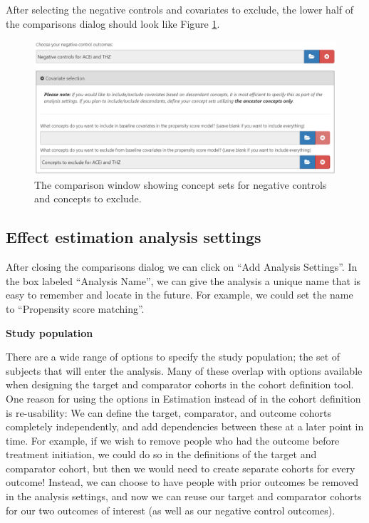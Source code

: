 \documentclass[11pt]{book}
\begin{document}
After selecting the negative controls and covariates to exclude, the
lower half of the comparisons dialog should look like Figure
\ref{fig:comparisons2}.

\begin{figure}

{\centering \includegraphics[width=1\linewidth]{images/PopulationLevelEstimation/comparisons2} 

}

\caption{The comparison window showing concept sets for negative controls and concepts to exclude.}\label{fig:comparisons2}
\end{figure}

\subsection{Effect estimation analysis
settings}\label{effect-estimation-analysis-settings}

After closing the comparisons dialog we can click on ``Add Analysis
Settings''. In the box labeled ``Analysis Name'', we can give the
analysis a unique name that is easy to remember and locate in the
future. For example, we could set the name to ``Propensity score
matching''.

\textbf{Study population}

There are a wide range of options to specify the study population; the
set of subjects that will enter the analysis. Many of these overlap with
options available when designing the target and comparator cohorts in
the cohort definition tool. One reason for using the options in
Estimation instead of in the cohort definition is re-usability: We can
define the target, comparator, and outcome cohorts completely
independently, and add dependencies between these at a later point in
time. For example, if we wish to remove people who had the outcome
before treatment initiation, we could do so in the definitions of the
target and comparator cohort, but then we would need to create separate
cohorts for every outcome! Instead, we can choose to have people with
prior outcomes be removed in the analysis settings, and now we can reuse
our target and comparator cohorts for our two outcomes of interest (as
well as our negative control outcomes).
\end{document}
